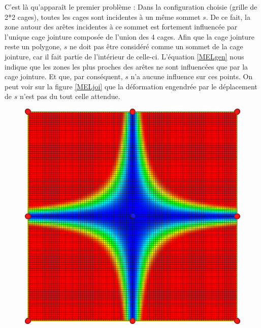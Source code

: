 C'est là qu'apparaît le premier problème : Dans la configuration
choisie (grille de 2*2 cages), toutes les cages sont incidentes à un
même sommet $s$. De ce fait, la zone autour des arêtes incidentes à ce
sommet est fortement influencée par l'unique cage jointure composée de
l'union des 4 cages. Afin que la cage jointure reste un polygone, $s$
ne doit pas être considéré comme un sommet de la cage jointure, car il
fait partie de l'intérieur de celle-ci. L'équation \ref{MELgen} nous
indique que les zones les plus proches des arêtes ne sont influencées
que par la cage jointure. Et que, par conséquent, $s$ n'a aucune
influence sur ces points. On peut voir sur la figure \ref{MELjoi} que
la déformation engendrée par le déplacement de $s$ n'est pas du tout
celle attendue.

\begin{figure}[ht]
  \begin{center}
    \includegraphics[scale=0.35]{starCage-jointure}

\end{center}
\end{figure}
